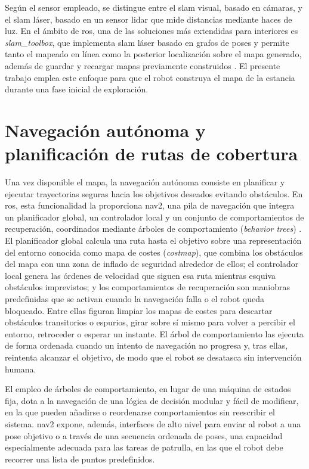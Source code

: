 Según el sensor empleado, se distingue entre el \gls{slam} visual, basado en
cámaras, y el \gls{slam} láser, basado en un sensor \gls{lidar} que mide
distancias mediante haces de luz. En el ámbito de \gls{ros}, una de las
soluciones más extendidas para interiores es \textit{slam\_toolbox}, que
implementa \gls{slam} láser basado en grafos de poses y permite tanto el mapeado
en línea como la posterior localización sobre el mapa generado, además de guardar
y recargar mapas previamente construidos \parencite{macenski2021slamtoolbox}. El
presente trabajo emplea este enfoque para que el robot construya el mapa de la
estancia durante una fase inicial de exploración.

\section{Navegación autónoma y planificación de rutas de cobertura}
\label{sec:navegacion}

Una vez disponible el mapa, la navegación autónoma consiste en planificar y
ejecutar trayectorias seguras hacia los objetivos deseados evitando obstáculos.
En \gls{ros}, esta funcionalidad la proporciona \gls{nav2}, una pila de
navegación que integra un planificador global, un controlador local y un conjunto
de comportamientos de recuperación, coordinados mediante árboles de comportamiento
(\textit{behavior trees}) \parencite{macenski2020nav2}. El planificador global
calcula una ruta hasta el objetivo sobre una representación del entorno conocida
como mapa de costes (\textit{costmap}), que combina los obstáculos del mapa con
una zona de inflado de seguridad alrededor de ellos; el controlador local genera
las órdenes de velocidad que siguen esa ruta mientras esquiva obstáculos
imprevistos; y los comportamientos de recuperación son maniobras predefinidas que
se activan cuando la navegación falla o el robot queda bloqueado. Entre ellas
figuran limpiar los mapas de costes para descartar obstáculos transitorios o
espurios, girar sobre sí mismo para volver a percibir el entorno, retroceder o
esperar un instante. El árbol de comportamiento las ejecuta de forma ordenada
cuando un intento de navegación no progresa y, tras ellas, reintenta alcanzar el
objetivo, de modo que el robot se desatasca sin intervención humana.

El empleo de árboles de comportamiento, en lugar de una máquina de estados fija,
dota a la navegación de una lógica de decisión modular y fácil de modificar, en
la que pueden añadirse o reordenarse comportamientos sin reescribir el sistema.
\gls{nav2} expone, además, interfaces de alto nivel para enviar al robot a una
pose objetivo o a través de una secuencia ordenada de poses, una capacidad
especialmente adecuada para las tareas de patrulla, en las que el robot debe
recorrer una lista de puntos predefinidos.

